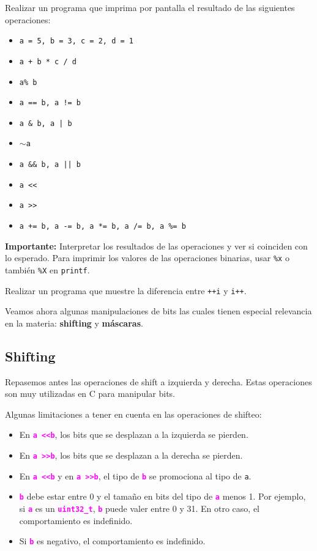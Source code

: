 \documentclass[]{scrartcl}
\newcommand{\hl}[1]{\textcolor{magenta}{\textbf{\texttt{#1}}}}
\begin{document}
\begin{exbox}[]
  Realizar un programa que imprima por pantalla el resultado de las siguientes operaciones:
  \begin{itemize}
    \item \texttt{a = 5, b = 3, c = 2, d = 1}
    \item \texttt{a + b * c / d}
    \item \texttt{a\space\space\% b}
    \item \texttt{a == b, a != b}
    \item \texttt{a \& b, a | b}
    \item \texttt{$\sim$a}
    \item \texttt{a \&\& b, a || b}
    \item \texttt{a \textless\textless {}}
    \item \texttt{a \textgreater\textgreater {}}
    \item \texttt{a += b, a -= b, a *= b, a /= b, a \%= b}
  \end{itemize}
  \textbf{Importante:} Interpretar los resultados de las operaciones y ver si coinciden con lo esperado. Para imprimir los valores de las operaciones binarias, usar \texttt{\%x} o también \texttt{\%X} en \texttt{printf}.
\end{exbox}

\begin{exbox}[label=ejercicio5]
  Realizar un programa que muestre la diferencia entre \texttt{++i} y \texttt{i++}.
\end{exbox}

Veamos ahora algunas manipulaciones de bits las cuales tienen especial relevancia en la materia: \textbf{shifting} y \textbf{máscaras}.

\subsection*{Shifting}

Repasemos antes las operaciones de shift a izquierda y derecha. Estas operaciones son muy utilizadas en C para manipular bits.

Algunas limitaciones a tener en cuenta en las operaciones de shifteo:
\begin{itemize}
  \item En \hl{a \textless\textless \space b}, los bits que se desplazan a la izquierda se pierden.
  \item En \hl{a \textgreater\textgreater \space b}, los bits que se desplazan a la derecha se pierden.
  \item En \hl{a \textless\textless \space b} y en \hl{a \textgreater\textgreater \space b}, el tipo de \hl{b} se promociona al tipo de \texttt{a}.
  \item \hl{b} debe estar entre 0 y el tamaño en bits del tipo de \hl{a} menos 1. Por ejemplo, si \hl{a} es un \hl{uint32\_t}, \hl{b} puede valer entre 0 y 31. En otro caso, el comportamiento es indefinido.
  \item Si \hl{b} es negativo, el comportamiento es indefinido.
\end{itemize}
\end{document}
